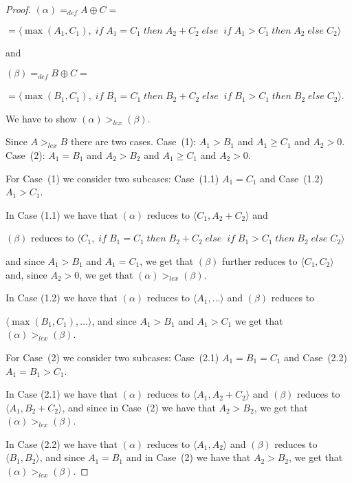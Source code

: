 \documentclass[english]{tlp}
\newcommand{\gl}{>_{\mathit{lex}}}
\newcommand{\bif}{\;{\mathit{if}}\;}
\newcommand{\bth}{\;{\mathit{then}}\;}
\newcommand{\bel}{\;{\mathit{else}}\;}
\renewcommand{\mathit}{\displaystyle}
\begin{document}
\begin{proof}
$(\alpha)=_{\mathit{def}}A\oplus C=$

$=\langle \max(A_1,C_1), \bif A_1\!=\!C_1\bth A_2\!+\!C_2 
\bel \! \bif A_1\!>\!C_1 \bth A_2 \bel C_2\rangle$ 

\noindent
and 

$(\beta)=_{\mathit{def}}B\oplus C =$

$= \langle 
\max(B_1,C_1), \bif B_1\!=\!C_1\bth B_2\!+\!C_2 
\bel \! \bif B_1\!>\!C_1 \bth B_2 \bel C_2\rangle$.

\noindent
We have to show $(\alpha)\gl (\beta)$.

\noindent
Since $A\gl B$ there are two cases. Case~(1): $A_1>B_1$ and $A_1\geq C_1$ 
and $A_2>0$. Case~(2):  $A_1=B_1$ and $A_2> B_2$ 
and $A_1\geq C_1$ and $A_2>0$.

\noindent
For Case~(1) we consider two subcases: Case~(1.1) $A_1=C_1$ and 
Case~(1.2) $A_1>C_1$.

\noindent
In Case (1.1) we have that $(\alpha)$ reduces to $\langle C_1,A_2+C_2\rangle $
and 

\noindent
$(\beta)$ reduces to $\langle C_1, \bif B_1=C_1\bth B_2\!+\!C_2 
\bel \! \bif B_1>C_1 \bth B_2 \bel C_2 \rangle $

\noindent
and since $A_1>B_1$ and $A_1=C_1$, we get that $(\beta)$ further reduces to 
$\langle C_1,  C_2 \rangle $ and, since $A_2>0$, we get that $(\alpha)\gl (\beta)$.

\noindent
In Case (1.2) we have that $(\alpha)$ reduces to 
$\langle A_1,  \ldots \rangle $ and 
$(\beta)$ reduces to 

\noindent
$\langle \max(B_1,C_1), \ldots \rangle $, and since 
$A_1>B_1$  and $A_1>C_1$ we 
get that $(\alpha)\gl (\beta)$.


\smallskip

\noindent
For Case~(2) we consider two subcases: Case~(2.1) $A_1=B_1=C_1$ and 
Case~(2.2) $A_1=B_1>C_1$.

\noindent
In Case (2.1) we have that $(\alpha)$ reduces to 
$\langle A_1,  A_2+C_2 \rangle $ and 
$(\beta)$ reduces to $\langle A_1,  B_2+C_2 \rangle $, and since 
in Case~(2) we have that $A_2>B_2$, we get that $(\alpha)\gl (\beta)$.

\noindent
In Case (2.2) we have that $(\alpha)$ reduces to 
$\langle A_1,  A_2 \rangle $ and 
$(\beta)$ reduces to $\langle B_1,  B_2 \rangle $, and since 
$A_1=B_1$ and in Case~(2) we have that $A_2>B_2$, we 
get that $(\alpha)\gl (\beta)$.












\end{proof}
\end{document}
